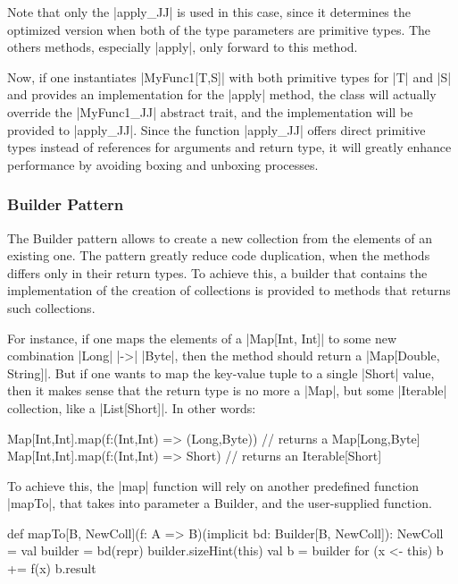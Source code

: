 Note that only the |apply_JJ| is used in this case, since it determines the optimized version when both of the type parameters are primitive types. The others methods, especially |apply|, only forward to this method.

Now, if one instantiates |MyFunc1[T,S]| with both primitive types for |T| and |S| and provides an implementation for the |apply| method, the class will actually override the |MyFunc1_JJ| abstract trait, and the implementation will be provided to |apply_JJ|. Since the function |apply_JJ| offers direct primitive types instead of references for arguments and return type, it will greatly enhance performance by avoiding boxing and unboxing processes.

\subsubsection{Builder Pattern}

The Builder pattern allows to create a new collection from the elements of an existing one. The pattern greatly reduce code duplication, when the methods differs only in their return types. To achieve this, a builder that contains the implementation of the creation of collections is provided to methods that returns such collections.


For instance, if one maps the elements of a |Map[Int, Int]| to some new combination |Long| |->| |Byte|, then the method should return a |Map[Double, String]|. But if one wants to map the key-value tuple to a single |Short| value, then it makes sense that the return type is no more a |Map|, but some |Iterable| collection, like a |List[Short]|. In other words:

\begin{lstlisting-nobreak}
 Map[Int,Int].map(f:(Int,Int) => (Long,Byte))
      // returns a Map[Long,Byte]
 Map[Int,Int].map(f:(Int,Int) => Short)
      // returns an Iterable[Short]
\end{lstlisting-nobreak}

To achieve this, the |map| function will rely on another predefined function |mapTo|, that takes into parameter a Builder, and the user-supplied function.

\begin{lstlisting-nobreak}
 def mapTo[B, NewColl](f: A => B)(implicit bd: Builder[B, NewColl]): NewColl = {
   val builder = bd(repr)
   builder.sizeHint(this)
   val b = builder
   for (x <- this) b += f(x)
   b.result
 }
\end{lstlisting-nobreak}




